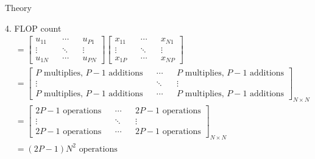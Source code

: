 \begin{section}{Theory}
\begin{homeworkSection}{4. FLOP count}
{\begin{align*}
		&= \begin{bmatrix} u_{11} && \cdots && u_{P1} \\ \vdots && \ddots && \vdots \\ u_{1N} && \cdots && u_{PN} \end{bmatrix} 
			 \begin{bmatrix} x_{11} && \cdots && x_{N1} \\ \vdots && \ddots && \vdots \\ x_{1P} && \cdots && x_{NP} \end{bmatrix} \\
		&= \begin{bmatrix}
			\text{$P$ multiplies, $P-1$ additions} && \cdots && \text{$P$ multiplies, $P-1$ additions} \\
			\vdots && \ddots && \vdots \\
			\text{$P$ multiplies, $P-1$ additions} && \cdots && \text{$P$ multiplies, $P-1$ additions}
			\end{bmatrix}_{N \times N} \\
		&= \begin{bmatrix}
			\text{$2P-1$ operations} && \cdots && \text{$2P-1$ operations} \\
			\vdots && \ddots && \vdots \\
			\text{$2P-1$ operations} && \cdots && \text{$2P-1$ operations}
			\end{bmatrix}_{N \times N} \\
		&= \text{$(2P-1)N^2$ operations}
	\end{align*}
}
\end{homeworkSection}

\end{section}


